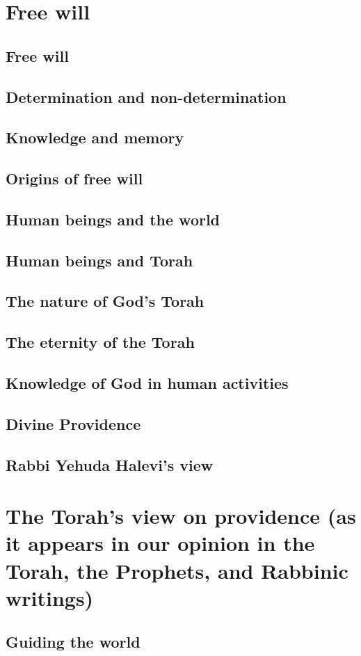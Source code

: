 \documentclass[11pt, a5paper, twoside, chapterprefix, openany]{scrbook}
\begin{document}
\part{Free will}
\chapter{Free will}
\chapter{Determination and non-determination}
\chapter{Knowledge and memory}
\chapter{Origins of free will}
\chapter{Human beings and the world}
\chapter{Human beings and Torah}
\chapter{The nature of God’s Torah}
\chapter{The eternity of the Torah}
\chapter{Knowledge of God in human activities}
\chapter{Divine Providence}
\chapter{Rabbi Yehuda Halevi’s view}
\part{The Torah’s view on providence (as it appears in our opinion in the Torah, the Prophets, and Rabbinic writings)}
\chapter{Guiding the world}
\end{document}
